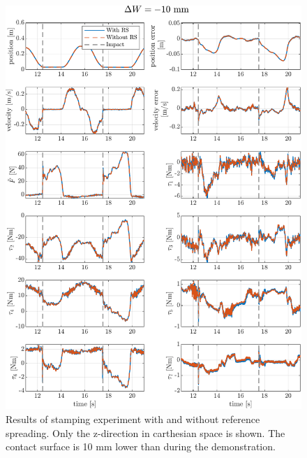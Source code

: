 \documentclass[11pt]{report}
\numberwithin{equation}{section}        %
\numberwithin{figure}{section}          %
\numberwithin{table}{section}           %
\begin{document}
 \begin{figure}[]
  \centering
  \begin{adjustwidth}{0pt}{5pt}
  \includegraphics[right]{Graphics/result-10mm.pdf}
  \end{adjustwidth}
  \caption{Results of stamping experiment with and without reference spreading. Only the z-direction in carthesian space is shown. The contact surface is 10 mm lower than during the demonstration.}
  \label{fig:results_-10mm}
  \end{figure}
\end{document}

